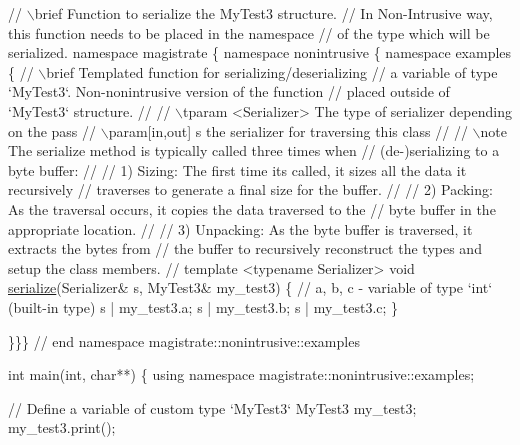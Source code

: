 \begin{DoxyCodeInclude}
{\textcolor{comment}{// \(\backslash\)brief Function to serialize the MyTest3 structure.}
\textcolor{comment}{// In Non-Intrusive way, this function needs to be placed in the namespace}
\textcolor{comment}{// of the type which will be serialized.}
\textcolor{keyword}{namespace }magistrate \{ \textcolor{keyword}{namespace }nonintrusive \{ \textcolor{keyword}{namespace }examples \{
  \textcolor{comment}{// \(\backslash\)brief Templated function for serializing/deserializing}
  \textcolor{comment}{// a variable of type `MyTest3`. Non-nonintrusive version of the function}
  \textcolor{comment}{// placed outside of `MyTest3` structure.}
  \textcolor{comment}{//}
  \textcolor{comment}{// \(\backslash\)tparam <Serializer> The type of serializer depending on the pass}
  \textcolor{comment}{// \(\backslash\)param[in,out] s the serializer for traversing this class}
  \textcolor{comment}{//}
  \textcolor{comment}{// \(\backslash\)note The serialize method is typically called three times when}
  \textcolor{comment}{// (de-)serializing to a byte buffer:}
  \textcolor{comment}{//}
  \textcolor{comment}{// 1) Sizing: The first time its called, it sizes all the data it recursively}
  \textcolor{comment}{// traverses to generate a final size for the buffer.}
  \textcolor{comment}{//}
  \textcolor{comment}{// 2) Packing: As the traversal occurs, it copies the data traversed to the}
  \textcolor{comment}{// byte buffer in the appropriate location.}
  \textcolor{comment}{//}
  \textcolor{comment}{// 3) Unpacking: As the byte buffer is traversed, it extracts the bytes from}
  \textcolor{comment}{// the buffer to recursively reconstruct the types and setup the class members.}
  \textcolor{comment}{//}
  \textcolor{keyword}{template} <\textcolor{keyword}{typename} Serializer>
  \textcolor{keywordtype}{void} \hyperlink{namespacecheckpoint_a075da4e7344cf037943362517e606c3a}{serialize}(Serializer& s, MyTest3& my\_test3) \{
    \textcolor{comment}{// a, b, c - variable of type `int` (built-in type)}
    s | my\_test3.a;
    s | my\_test3.b;
    s | my\_test3.c;
  \}

\}\}\} \textcolor{comment}{// end namespace magistrate::nonintrusive::examples}

\textcolor{keywordtype}{int} main(\textcolor{keywordtype}{int}, \textcolor{keywordtype}{char}**) \{
  \textcolor{keyword}{using namespace }magistrate::nonintrusive::examples;

  \textcolor{comment}{// Define a variable of custom type `MyTest3`}
  MyTest3 my\_test3;
  my\_test3.print();

}
\end{DoxyCodeInclude}
